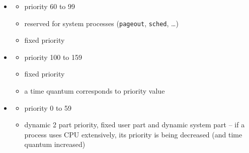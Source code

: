 \begin{slide}
\setlength{\baselineskip}{0.8\baselineskip}
\begin{itemize}
\item {}
    \begin{itemize}
    \item priority 60 to 99 
    \item reserved for system processes (\texttt{pageout},
    \texttt{sched}, \dots) 
    \item fixed priority 
    \end{itemize}
\item {}
    \begin{itemize}
    \item priority 100 to 159 
    \item fixed priority 
    \item a time quantum corresponds to priority value
    \end{itemize}
\item {}
    \begin{itemize}
    \item priority 0 to 59 
    \item dynamic 2 part priority, fixed user part and
    dynamic system part -- if a process uses CPU extensively,
    its priority is being decreased (and time quantum increased)
    \end{itemize}
\end{itemize}
\end{slide}

